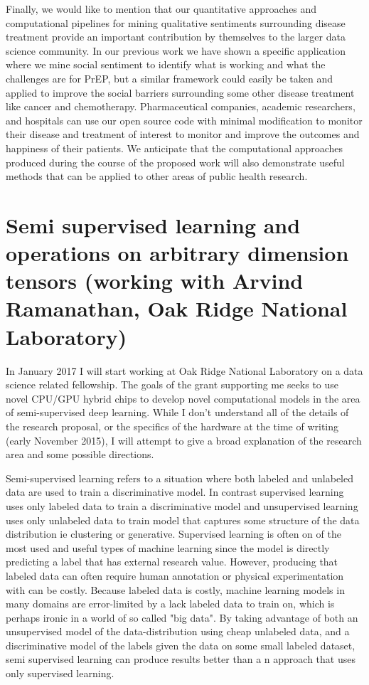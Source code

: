 Finally, we would like to mention that our quantitative approaches and computational pipelines for mining qualitative sentiments surrounding disease treatment provide an important contribution by themselves to the larger data science community. In our previous work we have shown a specific application where we mine social sentiment to identify what is working and what the challenges are for PrEP, but a similar framework could easily be taken and applied to improve the social barriers surrounding some other disease treatment like cancer and chemotherapy. Pharmaceutical companies, academic researchers, and hospitals can use our open source code with minimal modification to monitor their disease and treatment of interest to monitor and improve the outcomes and happiness of their patients. We anticipate that the computational approaches produced during the course of the proposed work will also demonstrate useful methods that can be applied to other areas of public health research.


\section{Semi supervised learning and operations on arbitrary dimension tensors (working with Arvind Ramanathan, Oak Ridge National Laboratory)}

In January 2017 I will start working at Oak Ridge National Laboratory on a data science related fellowship. The goals of the grant supporting me seeks to use novel CPU/GPU hybrid chips to develop novel computational models in the area of semi-supervised deep learning. While I don't understand all of the details of the research proposal, or the specifics of the hardware at the time of writing (early November 2015), I will attempt to give a broad explanation of the research area and some possible directions.

Semi-supervised learning refers to a situation where both labeled and unlabeled data are used to train a discriminative model\cite{zhu2011semi}. In contrast supervised learning uses only labeled data to train a discriminative model and unsupervised learning uses only unlabeled data to train model that captures some structure of the data distribution ie clustering or generative. Supervised learning is often on of the most used and useful types of machine learning since the model is directly predicting a label that has external research value. However, producing that labeled data can often require human annotation or physical experimentation with can be costly. Because labeled data is costly, machine learning models in many domains are error-limited by a lack labeled data to train on\cite{guillaumin2010multimodal}, which is perhaps ironic in a world of so called "big data". By taking advantage of both an unsupervised model of the data-distribution using cheap unlabeled data, and a discriminative model of the labels given the data on some small labeled dataset, semi supervised learning can produce results better than a n approach that uses only supervised learning.

